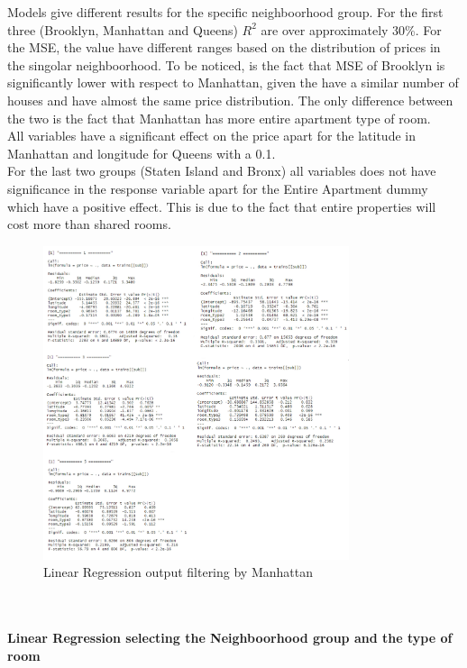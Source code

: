 \documentclass{FR16}
\begin{document}
\noindent Models give different results for the specific neighboorhood group. For the first three (Brooklyn, Manhattan and Queens) $R^2$ are over approximately 30\%. For the MSE, the value have different ranges based on the distribution of prices in the singolar neighboorhood. To be noticed, is the fact that MSE of Brooklyn is significantly lower with respect to Manhattan, given the have a similar number of houses and have almost the same price distribution. The only difference between the two is the fact that Manhattan has more entire apartment type of room. 
\\ All variables have a significant effect on the price apart for the latitude in Manhattan and longitude for Queens with a 0.1.  \\
For the last two groups (Staten Island and Bronx) all variables does not have significance in the response variable apart for the Entire Apartment dummy which have a positive effect. This is due to the fact that entire properties will cost more than shared rooms.
\begin{figure}[H]
\centering
\includegraphics[width=0.8\textwidth]{figures/lm2.jpg} 
\caption{\label{fig:6}  Linear Regression output filtering by  Manhattan}
\end{figure}
\noindent \\\\  \textbf{Linear Regression selecting the Neighboorhood group and the type of room}\\
\end{document}
